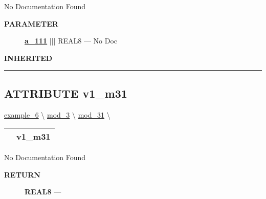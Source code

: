 No Documentation Found






\par
\begin{description}
\item [\colorbox{tagtype}{\color{white} \textbf{\textsf{PARAMETER}}}] \textbf{\underline{a\_111}} ||| REAL8 --- No Doc
\end{description}








\par
\begin{description}
\item [\colorbox{tagtype}{\color{white} \textbf{\textsf{INHERITED}}}] 
\end{description}



\rule{\linewidth}{0.5pt}
\subsection*{\textsf{\colorbox{headtoc}{\color{white} ATTRIBUTE}
v1\_m31}}

\hypertarget{ecldoc:intest.example_6.mod_3.mod_31.v1_m31}{}
\hspace{0pt} \hyperlink{ecldoc:intest.example_6}{example_6} \textbackslash 
\hspace{0pt} \hyperlink{ecldoc:intest.example_6.mod_3}{mod_3} \textbackslash 
\hspace{0pt} \hyperlink{ecldoc:intest.example_6.mod_3.mod_31}{mod_31} \textbackslash 

{\renewcommand{\arraystretch}{1.5}
\begin{tabularx}{\textwidth}{|>{\raggedright\arraybackslash}l|X|}
\hline
\hspace{0pt}\mytexttt{\color{red} } & \textbf{v1\_m31} \\
\hline
\end{tabularx}
}

\par





No Documentation Found








\par
\begin{description}
\item [\colorbox{tagtype}{\color{white} \textbf{\textsf{RETURN}}}] \textbf{REAL8} --- 
\end{description}




